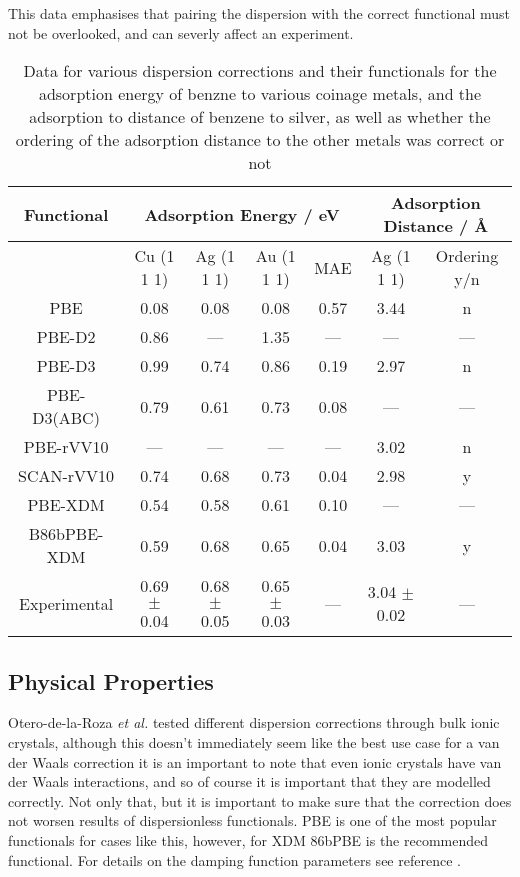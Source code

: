 \documentclass[10pt,a4paper,twocolumn,twoside]{extarticle}
\newcommand{\al}{\emph{et al. }}
\newcommand{\oA}{\si{\angstrom}}
\begin{document}
	This data emphasises that pairing the dispersion with the correct functional must not be overlooked, and can severly affect an experiment. 

	\begin{table*}
		\centering
		\begin{tabular}[]{c|c c c c | c c}
		Functional & \multicolumn{4}{c}{Adsorption Energy / eV \cite{Christian2016-CoinageAdsorption}}\ & \multicolumn{2}{c}{Adsorption Distance / \oA \cite{VV10-Adsorption}}\\
			\hline
			& Cu (1 1 1) & Ag (1 1 1) & Au (1 1 1) & MAE & Ag (1 1 1) &  Ordering y/n\\
		PBE	& 0.08 & 0.08 & 0.08 & 0.57 & 3.44 & n\\
		PBE-D2 & 0.86 & --- & 1.35 & --- & --- & ---\\
		PBE-D3 & 0.99 & 0.74 & 0.86 & 0.19 & 2.97 & n\\
		PBE-D3(ABC) & 0.79 & 0.61 & 0.73 & 0.08 & --- & ---\\
		PBE-rVV10 & --- & --- & --- & --- & 3.02 & n \\
		SCAN-rVV10 & 0.74 & 0.68 & 0.73 & 0.04 & 2.98 & y\\
		PBE-XDM & 0.54 & 0.58 & 0.61 & 0.10 & --- & ---\\
		B86bPBE-XDM & 0.59 & 0.68 & 0.65 & 0.04 & 3.03 & y\\
		Experimental & 0.69 $\pm$ 0.04 & 0.68 $\pm$ 0.05 & 0.65 $\pm$ 0.03 & --- & 3.04 $\pm$ 0.02 & ---
		\end{tabular}
		\caption{Data for various dispersion corrections and their functionals for the adsorption energy of benzne to various coinage metals\cite{Christian2016-CoinageAdsorption}, and the adsorption to distance of benzene to silver, as well as whether the ordering of the adsorption distance to the other metals was correct or not \cite{VV10-Adsorption}}
		\label{tab:adsorption}
	\end{table*}


	\subsection{Physical Properties}
	Otero-de-la-Roza \al tested different dispersion corrections through bulk ionic crystals\cite{Roza-2020-XDM}, although this doesn't immediately seem like the best use case for a van der Waals correction it is an important to note that even ionic crystals have van der Waals interactions, and so of course it is important that they are modelled correctly. Not only that, but it is important to make sure that the correction does not worsen results of dispersionless functionals. PBE is one of the most popular functionals for cases like this, however, for XDM 86bPBE is the recommended functional. For details on the damping function parameters see reference \cite{PBE-underbinding}. 
	
\end{document}

